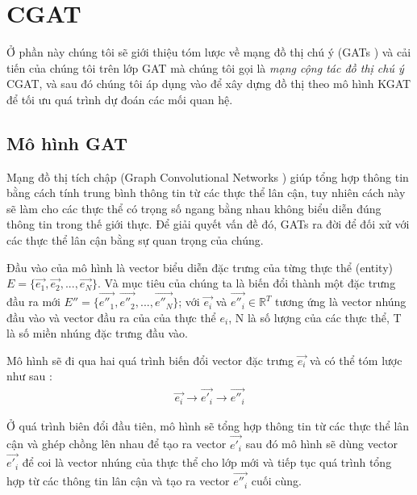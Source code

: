 \section{CGAT}

Ở phần này chúng tôi sẽ giới thiệu tóm lược về mạng đồ thị chú ý (GATs \cite{velivckovic2017graph}) và cải tiến của chúng tôi trên lớp GAT mà chúng tôi gọi là \textit{mạng cộng tác đồ thị chú ý} CGAT, và sau đó chúng tôi áp dụng vào để xây dựng đồ thị theo mô hình KGAT \cite{nathani2019learning} để tối ưu quá trình dự đoán các mối quan hệ. 

\subsection{Mô hình GAT}

Mạng đồ thị tích chập (Graph Convolutional Networks ) giúp tổng hợp thông tin bằng cách tính trung bình thông tin từ các thực thể lân cận, tuy nhiên cách này sẽ làm cho các thực thể có trọng số ngang bằng nhau không biểu diễn đúng thông tin trong thế giới thực. Để giải quyết vấn đề đó, GATs \cite{velivckovic2017graph} ra đời để đối xử với các thực thể lân cận bằng sự quan trọng của chúng.

Đầu vào của mô hình là vector biểu diễn đặc trưng của từng thực thể (entity) $E = \Big\{\overrightarrow{e_1}, \overrightarrow{e_2}, ...,  \overrightarrow{e_N}\Big\}$. Và mục tiêu của chúng ta là biến đổi thành một đặc trưng đầu ra mới $E'' = \Big\{\overrightarrow{e''_1}, \overrightarrow{e''_2}, ...,  \overrightarrow{e''_N}\Big\}$; với $\overrightarrow{e_i}$ và $\overrightarrow{e''_i} \in \mathbb{R}^T$ tương ứng là vector nhúng đầu vào và vector đầu ra của của thực thể $e_i$, N là số lượng của các thực thể, T là số miền nhúng đặc trưng đầu vào.

Mô hình sẽ đi qua hai quá trình biến đổi vector đặc trưng $\overrightarrow{e_i}$ và có thể tóm lược như sau :
\begin{align}
\overrightarrow{e_i} \longrightarrow \overrightarrow{e'_i} \longrightarrow \overrightarrow{e''_i}
\end{align}

Ở quá trình biên đổi đầu tiên, mô hình sẽ tổng hợp thông tin từ các thực thể lân cận và ghép chồng lên nhau để tạo ra vector $\overrightarrow{e'_i}$ sau đó mô hình sẽ dùng vector $\overrightarrow{e'_i}$ để coi là vector nhúng của thực thể cho lớp mới và tiếp tục quá trình tổng hợp từ các thông tin lân cận và tạo ra vector $\overrightarrow{e''_i}$ cuối cùng.

